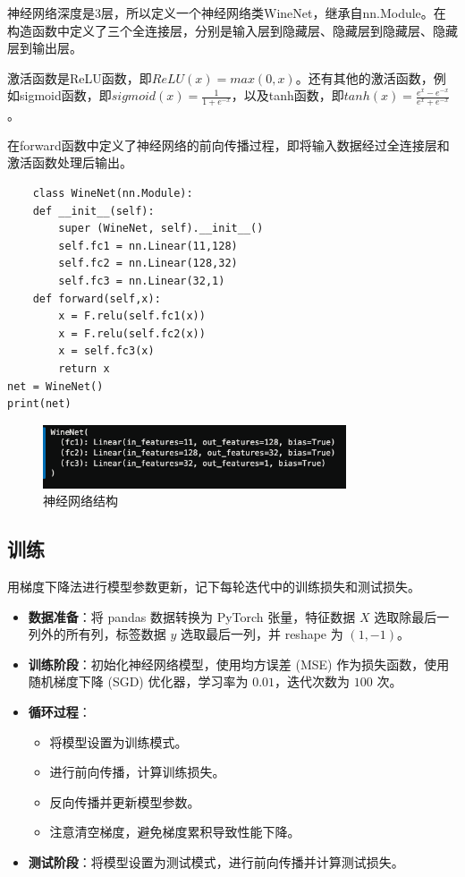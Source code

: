 \documentclass[12pt,a4paper,oneside]{article}
\begin{document}
神经网络深度是3层，所以定义一个神经网络类WineNet，继承自nn.Module。在构造函数中定义了三个全连接层，分别是输入层到隐藏层、隐藏层到隐藏层、隐藏层到输出层。

激活函数是ReLU函数，即$ReLU(x) = max(0, x)$。还有其他的激活函数，例如sigmoid函数，即$sigmoid(x) = \frac{1}{1 + e^{-x}}$，以及tanh函数，即$tanh(x) = \frac{e^x - e^{-x}}{e^x + e^{-x}}$。

在forward函数中定义了神经网络的前向传播过程，即将输入数据经过全连接层和激活函数处理后输出。

\begin{lstlisting}
    class WineNet(nn.Module):
    def __init__(self):
        super (WineNet, self).__init__()
        self.fc1 = nn.Linear(11,128)
        self.fc2 = nn.Linear(128,32)
        self.fc3 = nn.Linear(32,1)
    def forward(self,x):
        x = F.relu(self.fc1(x))
        x = F.relu(self.fc2(x))
        x = self.fc3(x)
        return x
net = WineNet()
print(net)
\end{lstlisting}

\begin{figure}[H]
    \centering
    \includegraphics[width=0.8\textwidth]{image/1.png}
    \caption{神经网络结构}
\end{figure}

\subsection{训练}
\qquad 用梯度下降法进行模型参数更新，记下每轮迭代中的训练损失和测试损失。

\begin{itemize}
    \item \textbf{数据准备}：将 pandas 数据转换为 PyTorch 张量，特征数据 $X$ 选取除最后一列外的所有列，标签数据 $y$ 选取最后一列，并 reshape 为 $(1, -1)$。
    \item \textbf{训练阶段}：初始化神经网络模型，使用均方误差 (MSE) 作为损失函数，使用随机梯度下降 (SGD) 优化器，学习率为 $0.01$，迭代次数为 $100$ 次。
    \item \textbf{循环过程}：
    \begin{itemize}
        \item 将模型设置为训练模式。
        \item 进行前向传播，计算训练损失。
        \item 反向传播并更新模型参数。
        \item 注意清空梯度，避免梯度累积导致性能下降。
    \end{itemize}
    \item \textbf{测试阶段}：将模型设置为测试模式，进行前向传播并计算测试损失。
\end{itemize}
\end{document}

